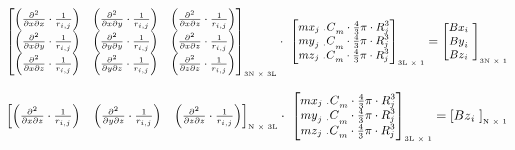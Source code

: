 \documentclass[manuscript,revised]{geophysics}
\begin{document}
\begin{equation} \label{eq:sphere5}
\small \left[\begin{matrix}\left(\frac{\partial^2}{\partial x\partial x}\cdot\frac{1}{r_{i,j}}\right)&\left(\frac{\partial^2}{\partial x\partial y}\cdot\frac{1}{r_{i,j}}\right)&\left(\frac{\partial^2}{\partial x\partial z}\cdot\frac{1}{r_{i,j}}\right)\\\left(\frac{\partial^2}{\partial x\partial y}\cdot\frac{1}{r_{i,j}}\right)&\left(\frac{\partial^2}{\partial y\partial y}\cdot\frac{1}{r_{i,j}}\right)&\left(\frac{\partial^2}{\partial x\partial z}\cdot\frac{1}{r_{i,j}}\right)\\\left(\frac{\partial^2}{\partial x\partial z}\cdot\frac{1}{r_{i,j}}\right)&\left(\frac{\partial^2}{\partial y\partial z}\cdot\frac{1}{r_{i,j}}\right)&\left(\frac{\partial^2}{\partial z\partial z}\cdot\frac{1}{r_{i,j}}\right)\\\end{matrix}\right]_{\text{\tiny 3N $\times$ 3L}}\cdot\ \left[\begin{matrix}{{mx}_{j\ \cdot}C}_m\cdot\frac{4}{3}\pi\cdot R_j^3\\{{my}_{j\ \cdot}C}_m\cdot\frac{4}{3}\pi\cdot R_j^3\\{{mz}_{j\ \cdot}C}_m\cdot\frac{4}{3}\pi\cdot R_j^3\\\end{matrix}\right]_{\text{\tiny 3L $\times$ 1}}=\left[\begin{matrix}{Bx}_{i\ }\\{By}_{i\ }\\{Bz}_{i\ }\\\end{matrix}\right]_{\text{\tiny 3N $\times$ 1}}
\end{equation}


\begin{equation} \label{eq:sphere6}
\small \left[\begin{matrix}\left(\frac{\partial^2}{\partial x\partial z}\cdot\frac{1}{r_{i,j}}\right)&\left(\frac{\partial^2}{\partial y\partial z}\cdot\frac{1}{r_{i,j}}\right)&\left(\frac{\partial^2}{\partial z\partial z}\cdot\frac{1}{r_{i,j}}\right)\\\end{matrix}\right]_{\text{\tiny N $\times$ 3L}}\cdot\ \left[\begin{matrix}{{mx}_{j\ \cdot}C}_m\cdot\frac{4}{3}\pi\cdot R_j^3\\{{my}_{j\ \cdot}C}_m\cdot\frac{4}{3}\pi\cdot R_j^3\\{{mz}_{j\ \cdot}C}_m\cdot\frac{4}{3}\pi\cdot R_j^3\\\end{matrix}\right]_{\text{\tiny 3L $\times$ 1}}=\left[{Bz}_{i\ }\right]_{\text{\tiny N $\times$ 1}}
\end{equation}
\end{document}
